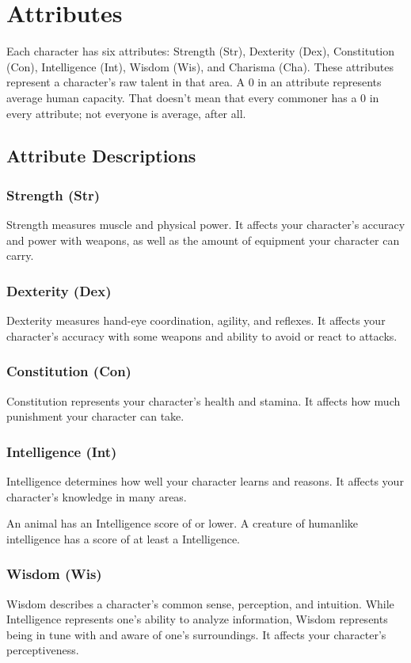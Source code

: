 \chapter{Attributes}
Each character has six attributes: Strength (Str), Dexterity (Dex), Constitution (Con), Intelligence (Int), Wisdom (Wis), and Charisma (Cha). These attributes represent a character's raw talent in that area. A 0 in an attribute represents average human capacity. That doesn't mean that every commoner has a 0 in every attribute; not everyone is average, after all.

\section{Attribute Descriptions}

\subsection{Strength (Str)}
Strength measures muscle and physical power. It affects your character's accuracy and power with weapons, as well as the amount of equipment your character can carry.

\subsection{Dexterity (Dex)}
Dexterity measures hand-eye coordination, agility, and reflexes. It affects your character's accuracy with some weapons and ability to avoid or react to attacks.

\subsection{Constitution (Con)}
Constitution represents your character's health and stamina. It affects how much punishment your character can take.

\subsection{Intelligence (Int)}
Intelligence determines how well your character learns and reasons. It affects your character's knowledge in many areas.

\par An animal has an Intelligence score of  or lower. A creature of humanlike intelligence has a score of at least a  Intelligence.

\subsection{Wisdom (Wis)}
Wisdom describes a character's common sense, perception, and intuition. While Intelligence represents one's ability to analyze information, Wisdom represents being in tune with and aware of one's surroundings. It affects your character's perceptiveness.

